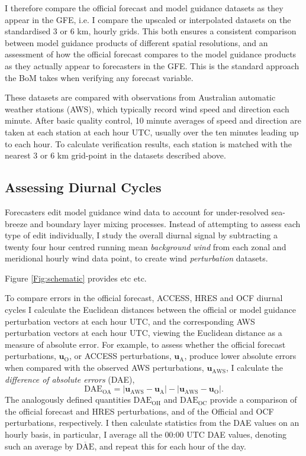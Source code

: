 \documentclass[twocol]{ametsoc}
\begin{document}
I therefore compare the official forecast and model guidance datasets as they appear in the GFE, i.e. I compare the upscaled or interpolated datasets on the standardised 3 or 6 km, hourly grids. This both ensures a consistent comparison between model guidance products of different spatial resolutions, and an assessment of how the official forecast compares to the model guidance products as they actually appear to forecasters in the GFE. This is the standard approach the BoM takes when verifying any forecast variable.

These datasets are compared with observations from Australian automatic weather stations (AWS), which typically record wind speed and direction each minute. After basic quality control, 10 minute averages of speed and direction are taken at each station at each hour UTC, usually over the ten minutes leading up to each hour. To calculate verification results, each station is matched with the nearest 3 or 6 km grid-point in the datasets described above.

\subsection{Assessing Diurnal Cycles}
Forecasters edit model guidance wind data to account for under-resolved sea-breeze and boundary layer mixing processes. Instead of attempting to assess each type of edit individually, I study the overall diurnal signal by subtracting a twenty four hour centred running mean \textit{background wind} from each zonal and meridional hourly wind data point, to create wind \emph{perturbation} datasets.

Figure \ref{Fig:schematic} provides etc etc.

To compare errors in the official forecast, ACCESS, HRES and OCF diurnal cycles I calculate the Euclidean distances between the official or model guidance perturbation vectors at each hour UTC, and the corresponding AWS perturbation vectors at each hour UTC, viewing the Euclidean distance as a measure of absolute error. For example, to assess whether the official forecast perturbations, $\mathbf{u}_{\text{O}}$, or ACCESS perturbations, $\mathbf{u}_{\text{A}}$, produce lower absolute errors when compared with the observed AWS perturbations, $\mathbf{u}_{\text{AWS}}$, I calculate the \textit{difference of absolute errors} (DAE), 
\begin{equation}
\text{DAE}_\text{OA} = \left\lvert \mathbf{u}_{\text{AWS}}-\mathbf{u}_{\text{A}} \right\rvert - \left\lvert \mathbf{u}_{\text{AWS}}-\mathbf{u}_{\text{O}} \right\rvert. \label{Eq:DAE}
\end{equation} 
The analogously defined quantities $\text{DAE}_\text{OH}$ and $\text{DAE}_\text{OC}$ provide a comparison of the official forecast and HRES perturbations, and of the Official and OCF perturbations, respectively. I then calculate statistics from the DAE values on an hourly basis, in particular, I average all the 00:00 UTC DAE values, denoting such an average by $\overline{\text{DAE}}$, and repeat this for each hour of the day. 
\end{document}
